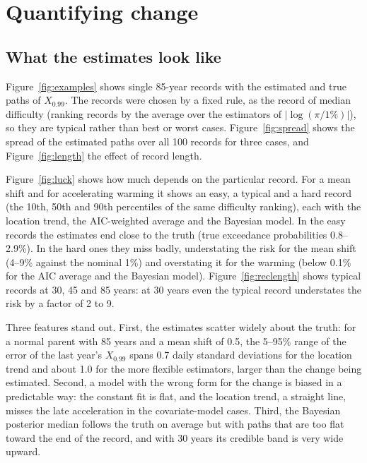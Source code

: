 \documentclass[11pt]{article}
\newcommand{\Xp}{X_{0.99}}
\begin{document}
\section{Quantifying change}\label{sec:quant}

\subsection{What the estimates look like}

Figure~\ref{fig:examples} shows single 85-year records with the estimated and true paths of
$\Xp$. The records were chosen by a fixed rule, as the record of median difficulty (ranking records
by the average over the estimators of $|\log(\pi/1\%)|$), so they are typical rather than best or
worst cases. Figure~\ref{fig:spread} shows the spread of the estimated paths over all 100
records for three cases, and Figure~\ref{fig:length} the effect of record length.

Figure~\ref{fig:luck} shows how much depends on the particular record. For a mean shift and for
accelerating warming it shows an easy, a typical and a hard record (the 10th, 50th and 90th
percentiles of the same difficulty ranking), each with the location trend, the AIC-weighted average
and the Bayesian model. In the easy records the estimates end close to the truth (true exceedance
probabilities 0.8--2.9\%). In the hard ones they miss badly, understating the risk for the mean shift
(4--9\% against the nominal 1\%) and overstating it for the warming (below 0.1\% for the AIC average
and the Bayesian model). Figure~\ref{fig:reclength} shows typical records at 30, 45 and 85 years: at
30 years even the typical record understates the risk by a factor of 2 to 9.

Three features stand out. First, the estimates scatter widely about the truth: for a normal parent with 85 years and a
mean shift of 0.5, the 5--95\% range of the error of the last year's $\Xp$ spans 0.7 daily
standard deviations for the location trend and about 1.0 for the more flexible estimators,
larger than the change being estimated. Second, a model with the wrong
form for the change is biased in a predictable way: the constant fit is flat, and the location
trend, a straight line, misses the late acceleration in the covariate-model cases. Third, the
Bayesian posterior median follows the truth on average but with paths that are too flat toward
the end of the record, and with 30 years its credible band is very wide upward.
\end{document}
